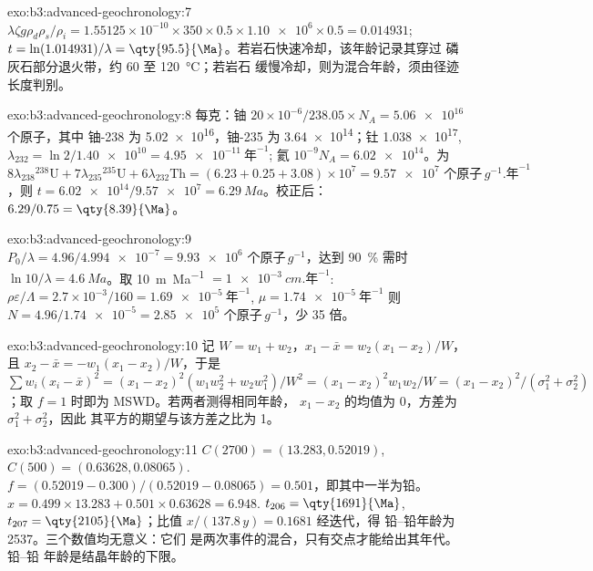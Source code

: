 \begin{solution}{exo:b3:advanced-geochronology:7}
$\lambda\zeta g\rho_d\rho_s/\rho_i = 1.55125\times10^{-10}\times350\times0.5
\times\num{1.10e6}\times0.5 = 0.014931$; $t = \ln(1.014931)/\lambda =
\qty{95.5}{\Ma}$。若岩石快速冷却，该年龄记录其穿过
磷灰石部分退火带，约 60 至 \qty{120}{\celsius}；若岩石
缓慢冷却，则为混合年龄，须由径迹长度判别。
\end{solution}

\begin{solution}{exo:b3:advanced-geochronology:8}
每克：铀 $20\times10^{-6}/238.05\times N_A = \num{5.06e16}$ 个原子，其中
铀-238 为 \num{5.02e16}，铀-235 为 \num{3.64e14}；钍
\num{1.038e17}, $\lambda_{232} = \ln 2/\num{1.40e10} = \qty{4.95e-11}{\text{年}^{-1}}$;
氦 $10^{-9}N_A = \num{6.02e14}$。为
$8\lambda_{238}{}^{238}\mathrm U + 7\lambda_{235}{}^{235}\mathrm U +
6\lambda_{232}\mathrm{Th} = (6.23 + 0.25 + 3.08)\times10^7 =
\num{9.57e7}\text{ 个原子}\,\unit{g^{-1}.\text{年}^{-1}}$，则 $t = \num{6.02e14}/\num{9.57e7} =
\qty{6.29}{Ma}$。校正后：$6.29/0.75 = \qty{8.39}{\Ma}$。
\end{solution}

\begin{solution}{exo:b3:advanced-geochronology:9}
$P_0/\lambda = 4.96/\num{4.994e-7} = \num{9.93e6}\text{ 个原子}\,\unit{g^{-1}}$，达到
\qty{90}{\percent} 需时 $\ln 10/\lambda = \qty{4.6}{Ma}$。取
\qty{10}{m.Ma^{-1}} $= \qty{1e-3}{cm.\text{年}^{-1}}$: $\rho\varepsilon/\Lambda =
2.7\times10^{-3}/160 = \qty{1.69e-5}{\text{年}^{-1}}$, $\mu = \qty{1.74e-5}{\text{年}^{-1}}$
则 $N = 4.96/\num{1.74e-5} = \num{2.85e5}\text{ 个原子}\,\unit{g^{-1}}$，少 35 倍。
\end{solution}

\begin{solution}{exo:b3:advanced-geochronology:10}
记 $W = w_1 + w_2$，$x_1 - \bar x = w_2(x_1 - x_2)/W$，且 $x_2 - \bar x =
-w_1(x_1 - x_2)/W$，于是 $\sum w_i(x_i - \bar x)^2 = (x_1 - x_2)^2(w_1w_2^2 +
w_2w_1^2)/W^2 = (x_1 - x_2)^2w_1w_2/W = (x_1 - x_2)^2/(\sigma_1^2 +
\sigma_2^2)$；取 $f = 1$ 时即为 MSWD。若两者测得相同年龄，
$x_1 - x_2$ 的均值为 0，方差为 $\sigma_1^2 + \sigma_2^2$，因此
其平方的期望与该方差之比为 1。
\end{solution}

\begin{solution}{exo:b3:advanced-geochronology:11}
$C(2700) = (13.283, 0.52019)$, $C(500) = (0.63628, 0.08065)$. $f = (0.52019 -
0.300)/(0.52019 - 0.08065) = 0.501$，即其中一半为铅。$x = 0.499\times13.283 +
0.501\times0.63628 = 6.948$. $t_{206} = \qty{1691}{\Ma}$, $t_{207} =
\qty{2105}{\Ma}$；比值 $x/(137.8\,y) = 0.1681$ 经迭代，得
铅–铅年龄为 \qty{2537}{\Ma}。三个数值均无意义：它们
是两次事件的混合，只有交点才能给出其年代。铅–铅
年龄是结晶年龄的下限。
\end{solution}

